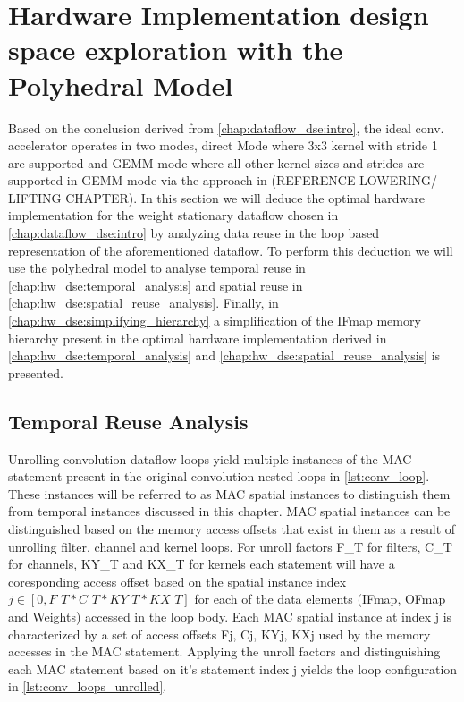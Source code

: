 \clearpage

\section{Hardware Implementation design space exploration with the Polyhedral Model}
\label{chap:hw_dse:intro}

Based on the conclusion derived from \autoref{chap:dataflow_dse:intro},
the ideal conv. accelerator operates in two modes, direct Mode where 3x3 kernel
with stride 1 are supported and GEMM mode where all other kernel sizes and
strides are supported in GEMM mode via the approach in (REFERENCE LOWERING/
LIFTING CHAPTER). In this section we will deduce the optimal hardware
implementation for the weight stationary dataflow chosen in
\autoref{chap:dataflow_dse:intro} by analyzing data reuse in the loop based
representation of the aforementioned dataflow. To perform this deduction we will
use the polyhedral model to analyse temporal reuse in
\autoref{chap:hw_dse:temporal_analysis} and spatial reuse in
\autoref{chap:hw_dse:spatial_reuse_analysis}. Finally, in
\autoref{chap:hw_dse:simplifying_hierarchy} a simplification of the IFmap memory
hierarchy present in the optimal hardware implementation derived in
\autoref{chap:hw_dse:temporal_analysis} and
\autoref{chap:hw_dse:spatial_reuse_analysis} is presented.

\subsection{Temporal Reuse Analysis}
\label{chap:hw_dse:temporal_analysis}

Unrolling convolution dataflow loops yield multiple instances of the \ac{MAC}
statement present in the original convolution nested loops in
\autoref{lst:conv_loop}. These instances will be referred to as \ac{MAC} spatial
instances to distinguish them from temporal instances discussed in this chapter.
\ac{MAC} spatial instances can be distinguished based on the memory access
offsets that exist in them as a result of unrolling filter, channel and kernel
loops. For unroll factors F\_T for filters, C\_T for channels, KY\_T and KX\_T
for kernels each statement will have a coresponding access offset based on the
spatial instance index $j \in [0, F\_T*C\_T*KY\_T*KX\_T]$ for each of the data
elements (IFmap, OFmap and Weights) accessed in the loop body. Each \ac{MAC}
spatial instance at index j is characterized by a set of access offsets {Fj, Cj,
KYj, KXj} used by the memory accesses in the \ac{MAC} statement. Applying the
unroll factors and distinguishing each \ac{MAC} statement based on it's
statement index j yields the loop configuration in
\autoref{lst:conv_loops_unrolled}. 

